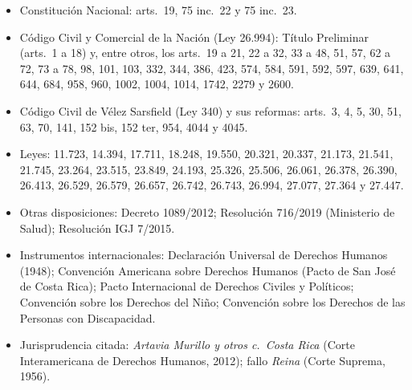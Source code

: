 \documentclass[12pt,oneside]{book}
\begin{document}
\begin{itemize}
\item Constitución Nacional: arts.~19, 75 inc.~22 y 75 inc.~23.
\item Código Civil y Comercial de la Nación (Ley 26.994): Título Preliminar (arts.~1 a 18) y, entre otros, los arts.~19 a 21, 22 a 32, 33 a 48, 51, 57, 62 a 72, 73 a 78, 98, 101, 103, 332, 344, 386, 423, 574, 584, 591, 592, 597, 639, 641, 644, 684, 958, 960, 1002, 1004, 1014, 1742, 2279 y 2600.
\item Código Civil de Vélez Sarsfield (Ley 340) y sus reformas: arts.~3, 4, 5, 30, 51, 63, 70, 141, 152 bis, 152 ter, 954, 4044 y 4045.
\item Leyes: 11.723, 14.394, 17.711, 18.248, 19.550, 20.321, 20.337, 21.173, 21.541, 21.745, 23.264, 23.515, 23.849, 24.193, 25.326, 25.506, 26.061, 26.378, 26.390, 26.413, 26.529, 26.579, 26.657, 26.742, 26.743, 26.994, 27.077, 27.364 y 27.447.
\item Otras disposiciones: Decreto 1089/2012; Resolución 716/2019 (Ministerio de Salud); Resolución IGJ 7/2015. %
\item Instrumentos internacionales: Declaración Universal de Derechos Humanos (1948); Convención Americana sobre Derechos Humanos (Pacto de San José de Costa Rica); Pacto Internacional de Derechos Civiles y Políticos; Convención sobre los Derechos del Niño; Convención sobre los Derechos de las Personas con Discapacidad.
\item Jurisprudencia citada: \textit{Artavia Murillo y otros c.\ Costa Rica} (Corte Interamericana de Derechos Humanos, 2012); fallo \textit{Reina} (Corte Suprema, 1956).
\end{itemize}
\end{document}
